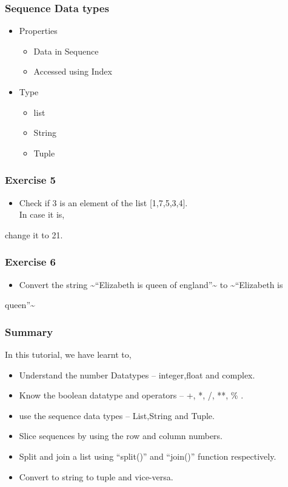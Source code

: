 \documentclass[presentation]{beamer}
\begin{document}
\begin{frame}
\frametitle{Sequence Data types}
\label{sec-10}
\begin{itemize}

\item Properties\\
\label{sec-10_1}%
\begin{itemize}
\item Data in Sequence
\item Accessed using Index
\end{itemize}

\item Type\\
\label{sec-10_2}%
\begin{itemize}
\item list
\item String
\item Tuple
\end{itemize}

\end{itemize} %
\end{frame}
\begin{frame}
\frametitle{Exercise 5}
\label{sec-11}


\begin{itemize}
\item Check if 3 is an element of the list [1,7,5,3,4].\\ In case it is,
\end{itemize}
change it to 21.
\end{frame}
\begin{frame}
\frametitle{Exercise 6}
\label{sec-12}


\begin{itemize}
\item Convert the string \~{}``Elizabeth is queen of england''\~{} to \~{}``Elizabeth is
\end{itemize}
queen''\~{}
\end{frame}
\begin{frame}
\frametitle{Summary}
\label{sec-13}

  In this tutorial, we have learnt to,


\begin{itemize}
\item Understand the number Datatypes -- integer,float and complex.
\item Know the boolean datatype and operators -- +, *, /, **, \% .
\item use the sequence data types -- List,String and Tuple.
\item Slice sequences by using the row and column numbers.
\item Split and join a list using ``split()'' and ``join()'' function respectively.
\item Convert to string to tuple and vice-versa.
\end{itemize}
\end{frame}
\end{document}
